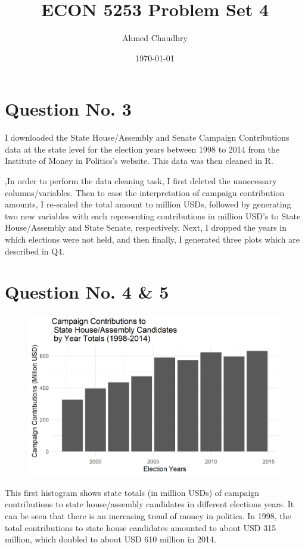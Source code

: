 \documentclass{article}
\title{ECON 5253 Problem Set 4}
\author{Ahmed Chaudhry}
\date{\today}
\begin{document}
\maketitle
\section{Question No. 3}
I downloaded the State House/Assembly and Senate Campaign Contributions data at the state level for the election years between 1998 to 2014 from the Institute of Money in Politics's website. This data was then cleaned in R.
 
,In order to perform the data cleaning task, I first deleted the unnecessary columns/variables. Then to ease the interpretation of campaign contribution amounts, I re-scaled the total amount to million USDs, followed by generating two new variables with each representing contributions in million USD's to State House/Assembly and State Senate, respectively. Next, I dropped the years in which elections were not held, and then finally, I generated three plots which are described in Q4. 
\section{Question No. 4 \& 5}
\begin{figure}[htp]
    \centering
    \includegraphics[]{PS6a_Chaudhry.png}
\end{figure}

This first histogram shows state totals (in million USDs) of campaign contributions to state house/assembly candidates in different elections years. It can be seen that there is an increasing trend of money in politics. In 1998, the total contributions to state house candidates amounted to about USD 315 million, which doubled to about USD 610 million in 2014.
\end{document}
